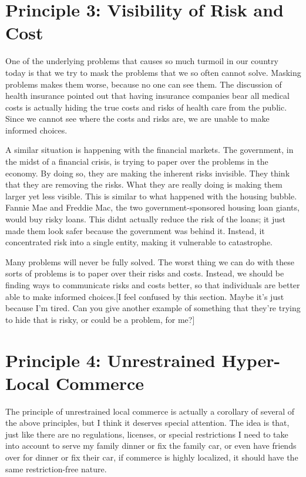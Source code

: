 \section{Principle 3: Visibility of Risk and Cost}

One of the underlying problems that causes so much turmoil in our
country today is that
we try to mask the
problems that we so often cannot solve.  Masking problems makes them
worse, because no one can see them. The discussion of health insurance
pointed out that having insurance companies bear all medical costs is
actually hiding the true costs and risks of health care from the
public. Since we cannot see where the costs and risks are, we are
unable to make informed choices.

A similar situation is happening with the financial markets. The
government, in the midst of
a financial crisis,
is trying to paper over the problems in the economy. By doing so, they
are making the inherent risks invisible. They think that they are
removing the risks. What they are really doing is making them larger
yet less visible. This is similar to what happened with the housing
bubble. Fannie Mae and Freddie Mac, the two government-sponsored
housing loan giants, would buy risky loans. This
didn{\textquotesingle}t actually reduce the risk of the loans; it just
made them look safer because the government was behind it. Instead, it
concentrated risk into a single entity, making it vulnerable to
catastrophe.

Many problems will never be fully solved. The worst thing we can do with
these sorts of problems is to paper over their risks and costs.
Instead, we should be finding ways to communicate risks and costs
better, so that individuals are better able to make informed
choices.[I feel
confused by this section. Maybe it’s just because I’m tired. Can you
give another example of something that they’re trying to hide that is
risky, or could be a problem, for me?]

\section{Principle 4: Unrestrained Hyper-Local Commerce}

The principle of unrestrained local commerce is actually a corollary of
several of the above principles, but I think it deserves special
attention. The idea is that, just like there are no regulations,
licenses, or special restrictions I need to take into account to serve
my family dinner or fix the family car, or even have friends over for
dinner or fix their car, if commerce is highly localized, it should
have the same restriction-free nature.

